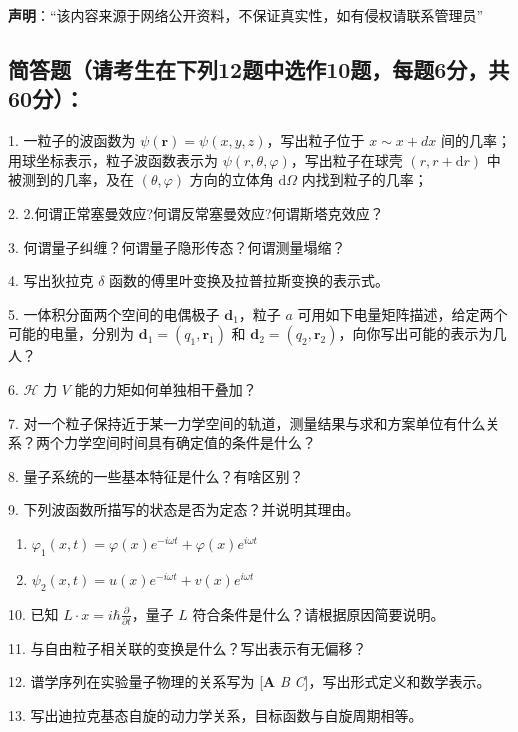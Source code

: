 
\textbf{声明}：“该内容来源于网络公开资料，不保证真实性，如有侵权请联系管理员”

\subsection{简答题（请考生在下列12题中选作10题，每题6分，共60分）：}

1. 一粒子的波函数为 $\psi (\mathbf{r}) = \psi (x, y, z)$，写出粒子位于 $x \sim x + d x$ 间的几率；用球坐标表示，粒子波函数表示为 $\psi (r, \theta, \varphi)$，写出粒子在球壳 $(r, r + \mathrm{d}r)$ 中被测到的几率，及在 $(\theta, \varphi)$ 方向的立体角 $\mathrm{d}\Omega$ 内找到粒子的几率；

2. 2.何谓正常塞曼效应?何谓反常塞曼效应?何谓斯塔克效应？

3. 何谓量子纠缠？何谓量子隐形传态？何谓测量塌缩？

4. 写出狄拉克 $\delta$ 函数的傅里叶变换及拉普拉斯变换的表示式。

5. 一体积分面两个空间的电偶极子 $ \mathbf{d}_1$，粒子 $a$ 可用如下电量矩阵描述，给定两个可能的电量，分别为 $\mathbf{d}_1 = (q_1, \mathbf{r}_1)$ 和 $\mathbf{d}_2 = (q_2, \mathbf{r}_2)$，向你写出可能的表示为几人？

6. $\mathcal{H}$ 力 $V$ 能的力矩如何单独相干叠加？

7. 对一个粒子保持近于某一力学空间的轨道，测量结果与求和方案单位有什么关系？两个力学空间时间具有确定值的条件是什么？

8. 量子系统的一些基本特征是什么？有啥区别？

9. 下列波函数所描写的状态是否为定态？并说明其理由。

\begin{enumerate}
  \item $\varphi_1 (x, t) = \varphi (x) e^{-i \omega t} + \varphi (x) e^{i \omega t}$
  \item $\psi_2 (x, t) = u (x) e^{-i \omega t} + v (x) e^{i \omega t}$
\end{enumerate}

10. 已知 $L \cdot x = i \hbar \frac{\partial}{\partial t}$，量子 $L$ 符合条件是什么？请根据原因简要说明。

11. 与自由粒子相关联的变换是什么？写出表示有无偏移？

12. 谱学序列在实验量子物理的关系写为 [\textbf{A} \textit{B} \textit{C}]，写出形式定义和数学表示。

13. 写出迪拉克基态自旋的动力学关系，目标函数与自旋周期相等。

